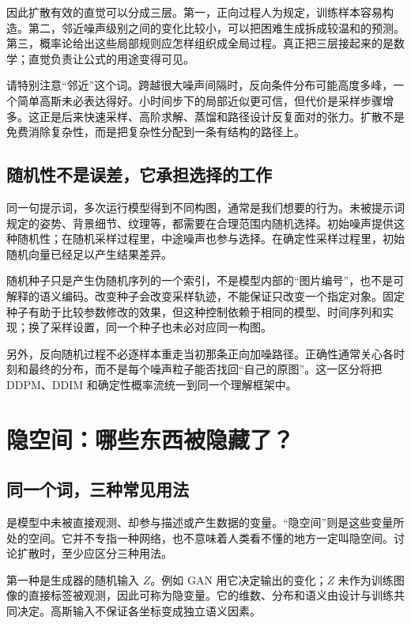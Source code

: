 因此扩散有效的直觉可以分成三层。第一，正向过程人为规定，训练样本容易构造。第二，邻近噪声级别之间的变化比较小，可以把困难生成拆成较温和的预测。第三，概率论给出这些局部规则应怎样组织成全局过程。真正把三层接起来的是数学；直觉负责让公式的用途变得可见。

请特别注意“邻近”这个词。跨越很大噪声间隔时，反向条件分布可能高度多峰，一个简单高斯未必表达得好。小时间步下的局部近似更可信，但代价是采样步骤增多。这正是后来快速采样、高阶求解、蒸馏和路径设计反复面对的张力。扩散不是免费消除复杂性，而是把复杂性分配到一条有结构的路径上。

\subsection{随机性不是误差，它承担选择的工作}

同一句提示词，多次运行模型得到不同构图，通常是我们想要的行为。未被提示词规定的姿势、背景细节、纹理等，都需要在合理范围内随机选择。初始噪声提供这种随机性；在随机采样过程里，中途噪声也参与选择。在确定性采样过程里，初始随机向量已经足以产生结果差异。

随机种子只是产生伪随机序列的一个索引，不是模型内部的“图片编号”，也不是可解释的语义编码。改变种子会改变采样轨迹，不能保证只改变一个指定对象。固定种子有助于比较参数修改的效果，但这种控制依赖于相同的模型、时间序列和实现；换了采样设置，同一个种子也未必对应同一构图。

另外，反向随机过程不必逐样本重走当初那条正向加噪路径。正确性通常关心各时刻和最终的分布，而不是每个噪声粒子能否找回“自己的原图”。这一区分将把 DDPM、DDIM 和确定性概率流统一到同一个理解框架中。

\section{隐空间：哪些东西被隐藏了？}
\label{sec:c-latent}

\subsection{同一个词，三种常见用法}

是模型中未被直接观测、却参与描述或产生数据的变量。“隐空间”则是这些变量所处的空间。它并不专指一种网络，也不意味着人类看不懂的地方一定叫隐空间。讨论扩散时，至少应区分三种用法。

第一种是生成器的随机输入 $Z$。例如 GAN 用它决定输出的变化；$Z$ 未作为训练图像的直接标签被观测，因此可称为隐变量。它的维数、分布和语义由设计与训练共同决定。高斯输入不保证各坐标变成独立语义因素。


